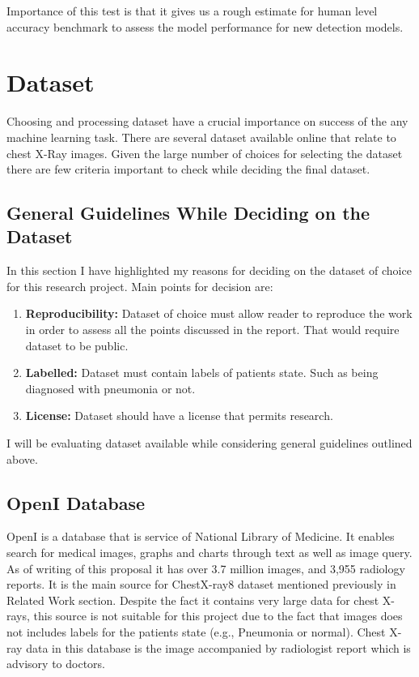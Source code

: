 \documentclass[12pt, twoside, a4paper]{article}
\begin{document}
Importance of this test is that it gives us a rough estimate for human level accuracy benchmark to assess the model performance for new detection models.


\clearpage
\section{Dataset}
Choosing and processing dataset have a crucial importance on success of the any machine learning task. There are several dataset available online that relate to chest X-Ray images. Given the large number of choices for selecting the dataset there are few criteria important to check while deciding the final dataset.

\subsection{General Guidelines While Deciding on the Dataset}
In this section I have highlighted my reasons for deciding on the dataset of choice for this research project. Main points for decision are:
\begin{enumerate}
    \item \textbf{Reproducibility: }Dataset of choice must allow reader to reproduce the work in order to assess all the points discussed in the report. That would require dataset to be public.
    \item \textbf{Labelled: }Dataset must contain labels of patients state. Such as being diagnosed with pneumonia or not.
    \item \textbf{License: }Dataset should have a license that permits research.
\end{enumerate}
I will be evaluating dataset available while considering general guidelines outlined above.

\subsection{OpenI Database}

OpenI\cite{openi} is a database that is service of National Library of Medicine. It enables search for medical images, graphs and charts through text as well as image query. As of writing of this proposal it has over 3.7 million images, and 3,955 radiology reports. It is the main source for ChestX-ray8 dataset mentioned previously in Related Work section. Despite the fact it contains very large data for chest X-rays, this source is not suitable for this project due to the fact that images does not includes labels for the patients state (e.g., Pneumonia or normal). Chest X-ray data in this database is the image accompanied by radiologist report which is advisory to doctors.
\end{document}
